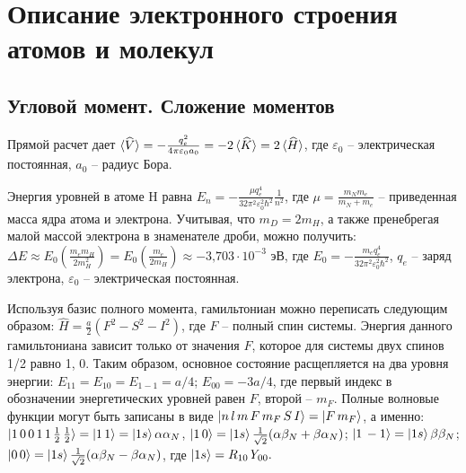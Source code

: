\setmainfont{Noto Serif}
\setsansfont{Noto Sans}
\setmonofont{Noto Sans Mono}


\section{Описание электронного строения атомов и молекул}
\subsection{Угловой момент. Сложение моментов}
 Прямой расчет дает $\braket{\widehat{V}}= -\frac{q_e^2}{4\pi \varepsilon_0 a_0}=-2\braket{ \widehat{K}}=2\braket {\widehat{H}}$, где $\varepsilon_0$ – электрическая постоянная, $a_0$ – радиус Бора. \par
{} Энергия уровней в атоме H равна $E_n = -\frac{\mu q_e^4}{32 \pi^2 \varepsilon_0^2 \hbar^2}\frac{1}{n^2}$, где $\mu=\frac{m_N m_e}{m_N + m_e}$ – приведенная масса ядра атома и электрона. Учитывая, что $m_D = 2m_H$, а также пренебрегая малой массой электрона в знаменателе дроби, можно получить: $\Delta E \approx E_0 ( \frac{m_em_H}{2m_H^2} ) = E_0 (\frac{m_e}{2m_H}) \approx -\text{3,703}\cdot \text{10}^{-\text{3}}$ эВ, где $E_0 = -\frac{ m_e q_e^4}{32 \pi^2 \varepsilon_0^2 \hbar^2}$, $q_e$ – заряд электрона, $\varepsilon_0$ – электрическая постоянная.\par
{} Используя базис полного момента, гамильтониан можно переписать следующим образом: $\widehat{H}=\frac{a}{2}( {F}^2 -{S}^2-{I}^2)$, где $F$ – полный спин системы. Энергия данного гамильтониана зависит только от значения $F$, которое для системы двух спинов 1/2 равно 1, 0. Таким образом, основное состояние расщепляется на два уровня энергии: $E_{11}=E_{10}=E_{1-1}=a/4$; $E_{00}=-3a/4$, где первый индекс в обозначении энергетических уровней равен $F$, второй – $m_F$. Полные волновые функции могут быть записаны в виде $\ket {n\,l\,m\,F\,m_F\,S\,I}=\ket{F\,m_F}$, а именно: $\ket{ 1\, 0\, 0\,  1\, 1\, \frac{1}{2}\, \frac{1}{2}} = \ket{1\,1} = \ket{1s}\alpha{\alpha}_N$, $\ket{1\,0} = \ket{1s}\frac{1}{\sqrt{2}}(\alpha{\beta}_N +{\beta}{\alpha}_N)$; $\ket{1\,-1} = \ket{1s}\beta{\beta}_N$; $\ket{0\,0} = \ket{1s}\frac{1}{\sqrt{2}}(\alpha{\beta}_N - {\beta}{\alpha}_N)$, где $\ket{1s} = R_{10}\textit{Y}_{00}.$\par
